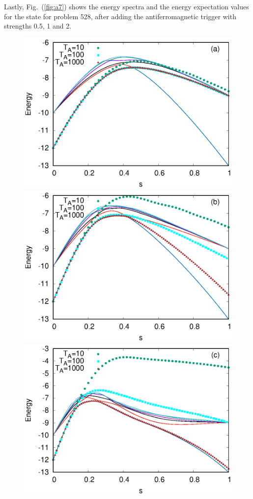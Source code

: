 \documentclass[../main.tex]{subfiles}
\begin{document}
Lastly, Fig.~(\ref{fig:a7}) shows the energy spectra and the energy expectation values for the state for problem 528, after adding the antiferromagnetic trigger with strengths 0.5, 1 and 2. 


\begin{figure}
\centering 
\includegraphics[scale=0.8]{528_s12_A_g0.eps}
\includegraphics[scale=0.8]{528_s12_A_g1.eps}
\includegraphics[scale=0.8]{528_s12_A_g2.eps}

\end{figure}
\end{document}
